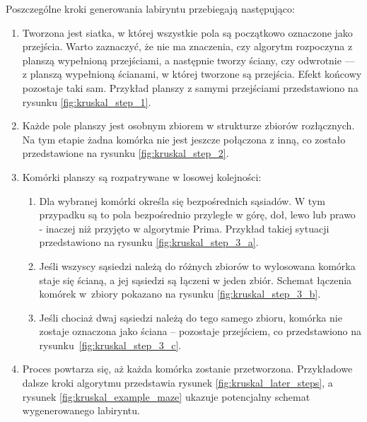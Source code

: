 Poszczególne kroki generowania labiryntu przebiegają następująco:
\begin{enumerate}
    \item Tworzona jest siatka, w której wszystkie pola są początkowo oznaczone jako przejścia. Warto zaznaczyć, że nie ma znaczenia, czy algorytm rozpoczyna z planszą wypełnioną przejściami, a następnie tworzy ściany, czy odwrotnie — z planszą wypełnioną ścianami, w której tworzone są przejścia. Efekt końcowy pozostaje taki sam. Przykład planszy z samymi przejściami przedstawiono na rysunku \ref{fig:kruskal_step_1}.

    

    \item Każde pole planszy jest osobnym zbiorem w strukturze zbiorów rozłącznych. Na tym etapie żadna komórka nie jest jeszcze połączona z inną, co zostało przedstawione na rysunku \ref{fig:kruskal_step_2}.

    

    \item Komórki planszy są rozpatrywane w losowej kolejności:
    \begin{enumerate}
        \item Dla wybranej komórki określa się bezpośrednich sąsiadów. W tym przypadku są to pola bezpośrednio przyległe w górę, doł, lewo lub prawo - inaczej niż przyjęto w algorytmie Prima. Przykład takiej sytuacji przedstawiono na rysunku \ref{fig:kruskal_step_3_a}.
        
        

        \item Jeśli wszyscy sąsiedzi należą do różnych zbiorów to wylosowana komórka staje się ścianą, a jej sąsiedzi są łączeni w jeden zbiór. Schemat łączenia komórek w~zbiory pokazano na rysunku \ref{fig:kruskal_step_3_b}.

        

        \item Jeśli chociaż dwaj sąsiedzi należą do tego samego zbioru, komórka nie zostaje oznaczona jako ściana – pozostaje przejściem, co przedstawiono na rysunku~\ref{fig:kruskal_step_3_c}.

        
    \end{enumerate}

    \item Proces powtarza się, aż każda komórka zostanie przetworzona. Przykładowe dalsze kroki algorytmu przedstawia rysunek \ref{fig:kruskal_later_steps}, a rysunek \ref{fig:kruskal_example_maze} ukazuje potencjalny schemat wygenerowanego labiryntu.
    
    

    
\end{enumerate}